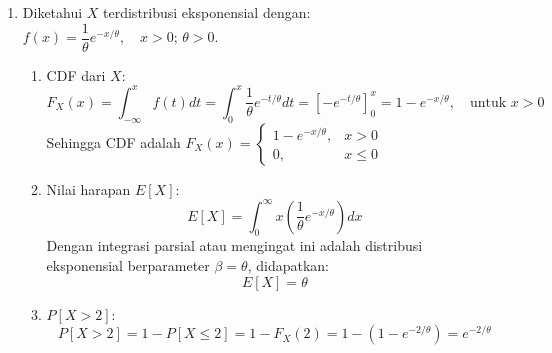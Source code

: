 \documentclass[11pt,letterpaper]{article}
\begin{document}
\begin{enumerate}
  \item Diketahui $X$ terdistribusi eksponensial dengan: $f(x) = \dfrac{1}{\theta}e^{-x/\theta}, \quad x > 0; \, \theta > 0$.
        \begin{enumerate}[label=\alph*.]
          \item CDF dari $X$:
                \[ F_X(x) = \int_{-\infty}^{x} f(t) dt = \int_{0}^{x} \dfrac{1}{\theta}e^{-t/\theta} dt = \left[-e^{-t/\theta}\right]_{0}^{x} = 1 - e^{-x/\theta}, \quad \text{untuk } x > 0 \]
                Sehingga CDF adalah $F_X(x) = \begin{cases} 1 - e^{-x/\theta}, & x > 0 \\ 0, & x \le 0 \end{cases}$
          \item Nilai harapan $E[X]$:
                \[ E[X] = \int_{0}^{\infty} x \left(\dfrac{1}{\theta}e^{-x/\theta}\right) dx \]
                Dengan integrasi parsial atau mengingat ini adalah distribusi eksponensial berparameter $\beta = \theta$, didapatkan:
                \[ E[X] = \theta \]
          \item $P[X > 2]$:
                \[ P[X > 2] = 1 - P[X \le 2] = 1 - F_X(2) = 1 - (1 - e^{-2/\theta}) = e^{-2/\theta} \]
        \end{enumerate}
        \vspace{0.3cm}


\end{enumerate}
\end{document}
